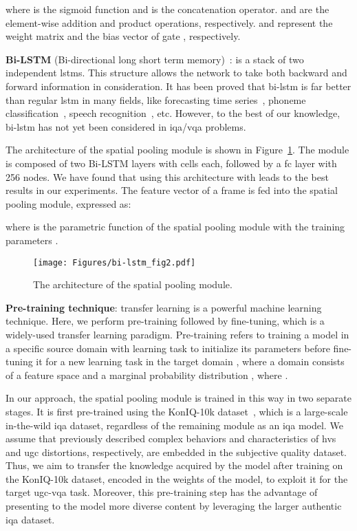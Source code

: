\documentclass[journal]{IEEEtran}
\begin{document}
where  is the sigmoid function and  is the concatenation operator.  and  are the element-wise addition and product operations, respectively.  and  represent the weight matrix and the bias vector of gate , respectively.


\vspace{1mm}
\textbf{Bi-LSTM} (Bi-directional long short term memory)~\cite{schuster1997bidirectional}: is a stack of two independent \acp{lstm}. This structure allows the network to take both backward and forward information in consideration. It has been proved that \ac{bi-lstm} is far better than regular \ac{lstm} in many fields, like forecasting time series~\cite{siami2019performance}, phoneme classification~\cite{graves2005framewise}, speech recognition~\cite{graves2013hybrid}, etc. However, to the best of our knowledge, \ac{bi-lstm} has not yet been considered in \ac{iqa}/\ac{vqa} problems. 

The architecture of the spatial pooling module is shown in Figure~\ref{Bi-LSTM}. The module is composed of two Bi-LSTM layers with  cells each, followed by a \ac{fc} layer with 256 nodes. We have found that using this architecture with  leads to the best results in our experiments. The feature vector  of a frame  is fed into the spatial pooling module, expressed as:

where  is the parametric function of the spatial pooling module with the training parameters .


\begin{figure}[t!]
\centering
 \texttt{[image: Figures/bi-lstm\_fig2.pdf]}
\caption{The architecture of the spatial pooling module.}
\label{Bi-LSTM}\vspace{-4mm}
\end{figure}


\vspace{1mm}
\textbf{Pre-training technique}: transfer learning is a powerful machine learning technique. Here, we perform pre-training followed by fine-tuning, which is a widely-used transfer learning paradigm. Pre-training refers to training a
model in a specific source domain  with  learning task  to initialize its parameters before fine-tuning it for a new learning task  in the target domain , where a domain  consists of a feature space  and a marginal probability distribution , where . 






In our approach, the spatial pooling module is trained in this way in two separate stages. It is first pre-trained using the KonIQ-10k  dataset~\cite{hosu2020koniq}, which is a large-scale in-the-wild \ac{iqa} dataset, regardless of the remaining module as an \ac{iqa} model. We assume that previously described complex behaviors and characteristics of \ac{hvs} and \ac{ugc} distortions, respectively, are embedded in the subjective quality dataset. Thus, we aim to transfer the knowledge acquired by the model after training on the KonIQ-10k  dataset, encoded in the weights of the model, to exploit it for the target \ac{ugc}-\ac{vqa} task. Moreover, this pre-training step has the advantage of presenting to the model more diverse content by leveraging the larger authentic \ac{iqa} dataset. 
\end{document}

